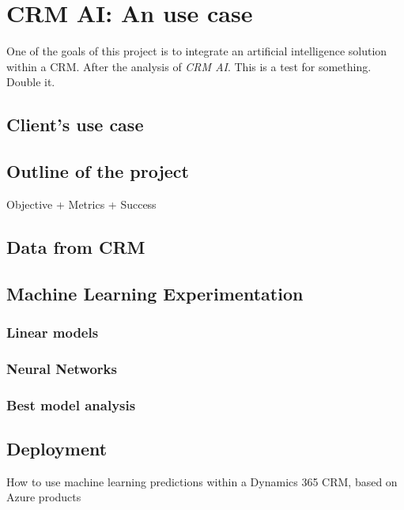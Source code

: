\chapter{CRM AI: An use case}

One of the goals of this project is to integrate an artificial intelligence solution within a CRM. After the analysis of \textit{CRM AI}. This is a test for something. Double it.

\section{Client's use case}
\lipsum[1]


\section{Outline of the project}
Objective + Metrics + Success

\lipsum[1]

\section{Data from CRM}
\lipsum[1]


\section{Machine Learning Experimentation}
\lipsum[1]

\subsection{Linear models}
\lipsum[2]

\subsection{Neural Networks}
\lipsum[3]

\subsection{Best model analysis}
\lipsum[3]


\section{Deployment}
How to use machine learning predictions within a Dynamics 365 CRM, based on Azure products

